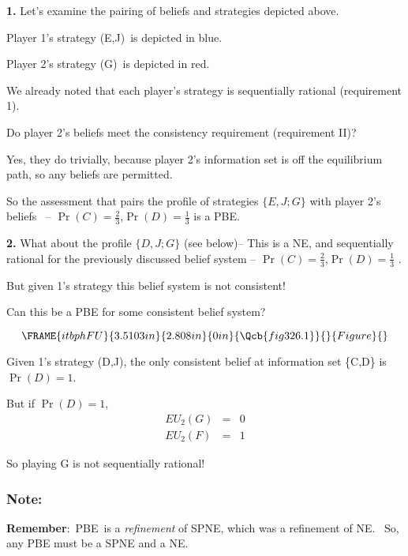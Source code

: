 \documentclass{article}
\begin{document}
\textbf{1. }Let's examine the pairing of beliefs and strategies depicted
above. \ 

Player 1's strategy (E,J)\ is depicted in blue.

Player 2's strategy (G)\ is depicted in red. \ 

We already noted that each player's strategy is sequentially rational
(requirement 1).

Do player 2's beliefs meet the consistency requirement (requirement II)?

Yes, they do trivially, because player 2's information set is off the
equilibrium path, so any beliefs are permitted.

So the assessment that pairs the profile of strategies $\{E,J;G\}$ with
player 2's beliefs \ -- $\Pr (C)=\frac{2}{3}$,$\Pr (D)=\frac{1}{3}$ is a PBE.

\bigskip

\textbf{2. }What about the profile $\{D,J;G\}$ (see below)-- This is a NE,
and sequentially rational for the previously discussed belief system -- $\Pr
(C)=\frac{2}{3}$,$\Pr (D)=\frac{1}{3}$ .

But given 1's strategy this belief system is not consistent! \ 

Can this be a PBE for some consistent belief system?

\[
\FRAME{itbphFU}{3.5103in}{2.808in}{0in}{\Qcb{fig 326.1}}{}{Figure}{\special%
{language "Scientific Word";type "GRAPHIC";maintain-aspect-ratio
TRUE;display "USEDEF";valid_file "T";width 3.5103in;height 2.808in;depth
0in;original-width 5.3358in;original-height 4.6484in;cropleft "0";croptop
"1";cropright "1";cropbottom "0";tempfilename
'JSY1RZ0E.wmf';tempfile-properties "XPR";}} 
\]

Given 1's strategy (D,J), the only consistent belief at information set
\{C,D\} is $\Pr (D)=1$.

But if $\Pr (D)=1$, 
\begin{eqnarray*}
EU_{2}(G) &=&0 \\
EU_{2}(F) &=&1
\end{eqnarray*}

So playing G is not sequentially rational!

\bigskip

\subsubsection{\textbf{Note:}}

\textbf{Remember}:\ PBE\ is a \textit{refinement }of SPNE, which was a
refinement of NE. \ So, any PBE must be a SPNE and a NE. \ 
\end{document}
